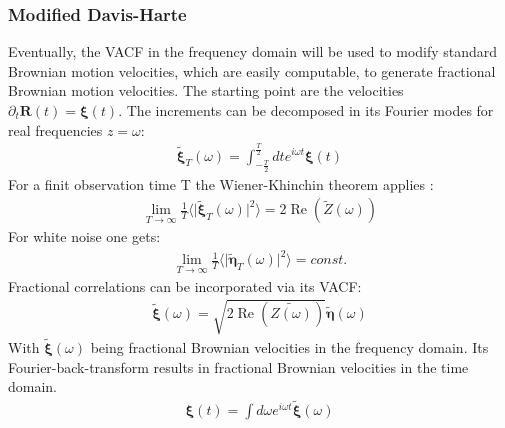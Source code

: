 \documentclass[
  a4paper,BCOR10mm,oneside,
  bibtotoc,idxtotoc,
  headsepline,footsepline,%
  fleqn,openbib
]{scrbook}
\begin{document}
\subsubsection{Modified Davis-Harte}
Eventually, the VACF in the frequency domain will be used to modify standard Brownian motion velocities, which are easily computable, to generate fractional Brownian motion velocities. The starting point are the velocities $\partial_t \bm{R}(t)=\bm{\xi}(t)$. The increments can be decomposed in its Fourier modes for real frequencies $z=\omega$:
\begin{align}
 \tilde{\bm{\xi}}_{T}(\omega)=\int_{-\frac{T}{2}}^{\frac{T}{2}} dt e^{i \omega t} \bm{\xi}(t) \label{eq:fourier}
\end{align}
For a finit observation time T the Wiener-Khinchin theorem applies :
\begin{align}
 \lim_{T\to\infty}\frac{1}{T}\langle \lvert  \tilde{\bm{\xi}}_{T}(\omega) \rvert^2  \rangle = 2  \operatorname{Re} \left(\tilde{Z}(\omega)\right)
\end{align}
For white noise one gets: 
\begin{align}
 \lim_{T\to\infty}\frac{1}{T}\langle \lvert  \tilde{\bm{\eta}}_{T}(\omega) \rvert^2 \rangle = const.
\end{align}
Fractional correlations can be incorporated via its VACF:
\begin{align}
\tilde{\bm{\xi}}(\omega) = \sqrt{2 \operatorname{Re} \left(\tilde{Z(\omega)}\right)}  \tilde{\bm{\eta}}(\omega) \label{eq:fracvacf}
\end{align}
 With $\tilde{\bm{\xi}}(\omega)$ being fractional Brownian velocities in the frequency domain. Its Fourier-back-transform results in fractional Brownian velocities in the time domain.
\begin{align}
\bm{\xi}(t)=\int d \omega e^{i \omega t} \tilde{\bm{\xi}}(\omega) \label{eq:fourier2}
\end{align}
\end{document}
